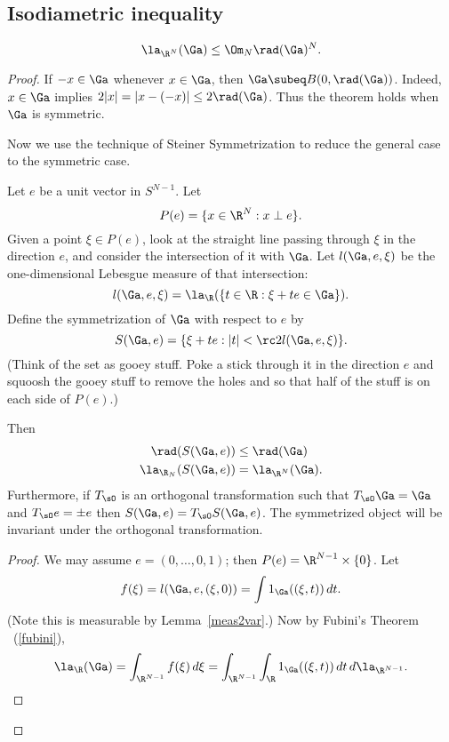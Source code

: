 
\subsection{Isodiametric inequality}
\begin{thm}
\[
\la_{\R^N}(\Ga)\le \Om_N \rad(\Ga)^N.
\]
\end{thm}
\begin{proof}
If $-x\in \Ga$ whenever $x\in \Ga$, then $\Ga\subeq B(0,\rad(\Ga))$. Indeed, $x\in \Ga$ implies $2|x|=|x-(-x)|\le 2\rad(\Ga)$. Thus the theorem holds when $\Ga$ is symmetric.

Now we use the technique of Steiner Symmetrization to reduce the general case to the symmetric case.

\begin{thm}
Let $e$ be a unit vector in $S^{N-1}$. Let
\[
P(e)=\{x\in \R^N:x\perp e\}.
\]
Given a point $\xi\in P(e)$, look at the straight line passing through $\xi$ in the direction $e$, and consider the intersection of it with $\Ga$. Let $l(\Ga,e,\xi)$ be the one-dimensional Lebesgue measure of that intersection:
\[l(\Ga,e,\xi)=\la_{\R}(\{t\in \R:\xi+te\in \Ga\}).
\]
Define the symmetrization of $\Ga$ with respect to $e$ by
\[
S(\Ga,e)=\{\xi+te:|t|<\rc 2l(\Ga,e,\xi)\}.
\]
(Think of the set as gooey stuff. Poke a stick through it in the direction $e$ and squoosh the gooey stuff to remove the holes and so that half of the stuff is on each side of $P(e)$.)

Then
\begin{align}
\rad(S(\Ga,e))&\le \rad(\Ga)\\
\la_{\R_N}(S(\Ga,e))&=\la_{\R^N}(\Ga).
\end{align}
Furthermore, if $T_{\sO}$ is an orthogonal transformation such that  $T_{\sO}\Ga=\Ga$ and $T_{\sO}e=\pm e$ then $S(\Ga,e)=T_{\sO}S(\Ga,e)$.
The symmetrized object will be invariant under the orthogonal transformation.
\end{thm}
\begin{proof}
We may assume $e=(0,\ldots, 0,1)$; then $P(e)=\R^{N-1}\times \{0\}$. Let
\[
f(\xi)=l(\Ga,e,(\xi,0))=\int 1_{\Ga}((\xi,t))\,dt.
\]
(Note this is measurable by Lemma~\ref{meas2var}.) Now by Fubini's Theorem ~(\ref{fubini}),
\[
\la_{\R}(\Ga)=\int_{\R^{N-1}} f(\xi)\,d\xi=\int_{\R^{N-1}}\int_{\R} 1_{\Ga}((\xi,t))\,dt\,d\la_{\R^{N-1}}.
\]


\end{proof}
\end{proof}

